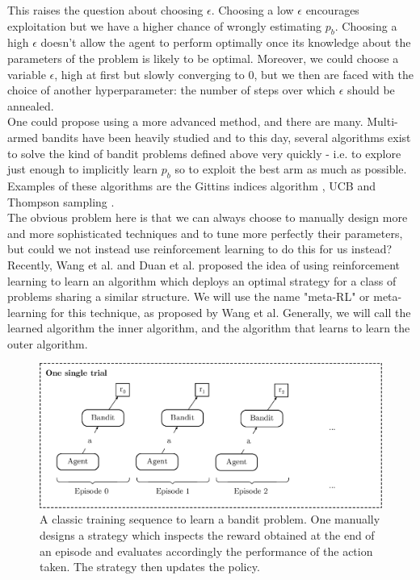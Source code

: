 This raises the question about choosing $\epsilon$. Choosing a low $\epsilon$
encourages exploitation but we have a higher chance of wrongly estimating $p_b$.
Choosing a high $\epsilon$ doesn't allow the agent to perform optimally once
its knowledge about the parameters of the problem is likely to be optimal.
Moreover, we could choose a variable $\epsilon$, high at first but slowly
converging to 0, but we then are faced with the choice of another
hyperparameter: the number of steps over which $\epsilon$ should be annealed.\\

One could propose using a more advanced method, and there are many. Multi-armed
bandits have been heavily studied and to this day, several algorithms exist to
solve the kind of bandit problems defined above very quickly - i.e. to explore
just enough to implicitly learn $p_b$ so to exploit the best arm as much as
possible. Examples of these algorithms are the Gittins indices algorithm
\cite{Gittins79banditprocesses},
UCB \cite{Auer:2002:FAM:599614.599677} and Thompson sampling
\cite{thompson1933}.\\

The obvious problem here is that we can always choose to manually design more
and more sophisticated techniques and to tune more perfectly their parameters,
but could we not instead use reinforcement learning to do this for us instead?\\

Recently, Wang et al. \cite{learningtorl} and Duan et al. \cite{fastrlviaslowrl}
proposed the idea of using reinforcement learning to learn an algorithm which
deploys an optimal strategy for a class of problems sharing a similar structure.
We will use the name "meta-RL" or meta-learning for this technique, as proposed 
by Wang et al. Generally, we will call the learned algorithm the inner
algorithm, and the algorithm that learns to learn the outer algorithm.\\

\begin{figure}
	\centering
	\includegraphics[width=0.7\linewidth]{fig/normal_bandit_training.eps}
	\caption{A classic training sequence to learn a bandit problem. One
	manually designs a strategy which inspects the reward obtained at 
	the end of an episode and evaluates accordingly the performance of the action
	taken. The strategy then updates the policy.}
	\label{fig:normal_bandit_training}
\end{figure}


